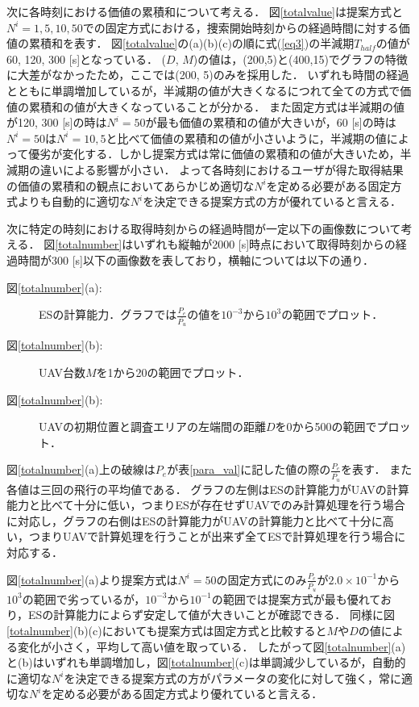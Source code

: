 \documentclass{ieeeaccess}
\begin{document}
次に各時刻における価値の累積和について考える．
図\ref{totalvalue}は提案方式と$N^i=1, 5, 10, 50$での固定方式における，捜索開始時刻からの経過時間に対する価値の累積和を表す．
図\ref{totalvalue}の(a)(b)(c)の順に式(\ref{eq3})の半減期$T_{half}$の値が60, 120,  300 [s]となっている．
($D$, $M$)の値は，(200,5)と(400,15)でグラフの特徴に大差がなかったため，ここでは(200, 5)のみを採用した．
いずれも時間の経過とともに単調増加しているが，半減期の値が大きくなるにつれて全ての方式で価値の累積和の値が大きくなっていることが分かる．
また固定方式は半減期の値が120, 300 [s]の時は$N^i=50$が最も価値の累積和の値が大きいが，60 [s]の時は$N^i=50$は$N^i=10, 5$と比べて価値の累積和の値が小さいように，半減期の値によって優劣が変化する．しかし提案方式は常に価値の累積和の値が大きいため，半減期の違いによる影響が小さい．
よって各時刻におけるユーザが得た取得結果の価値の累積和の観点においてあらかじめ適切な$N^i$を定める必要がある固定方式よりも自動的に適切な$N^i$を決定できる提案方式の方が優れていると言える．

次に特定の時刻における取得時刻からの経過時間が一定以下の画像数について考える．
図\ref{totalnumber}はいずれも縦軸が2000 [s]時点において取得時刻からの経過時間が300 [s]以下の画像数を表しており，横軸については以下の通り．
\begin{description}
\item[図\ref{totalnumber}(a):]ESの計算能力．グラフでは$\frac{P_e}{\overline{P_u}}$の値を$10^{-3}$から$10^3$の範囲でプロット．
\item[図\ref{totalnumber}(b):]UAV台数$M$を1から20の範囲でプロット．
\item[図\ref{totalnumber}(b):]UAVの初期位置と調査エリアの左端間の距離$D$を0から500の範囲でプロット．
\end{description}

図\ref{totalnumber}(a)上の破線は$P_e$が表\ref{para_val}に記した値の際の$\frac{P_e}{\overline{P_u}}$を表す．
また各値は三回の飛行の平均値である．
グラフの左側はESの計算能力がUAVの計算能力と比べて十分に低い，つまりESが存在せずUAVでのみ計算処理を行う場合に対応し，グラフの右側はESの計算能力がUAVの計算能力と比べて十分に高い，つまりUAVで計算処理を行うことが出来ず全てESで計算処理を行う場合に対応する．

図\ref{totalnumber}(a)より提案方式は$N^i=50$の固定方式にのみ$\frac{P_e}{\overline{P_u}}$が$2.0\times10^{-1}$から$10^3$の範囲で劣っているが，$10^{-3}$から$10^{-1}$の範囲では提案方式が最も優れており，ESの計算能力によらず安定して値が大きいことが確認できる．
同様に図\ref{totalnumber}(b)(c)においても提案方式は固定方式と比較すると$M$や$D$の値による変化が小さく，平均して高い値を取っている．
したがって図\ref{totalnumber}(a)と(b)はいずれも単調増加し，図\ref{totalnumber}(c)は単調減少しているが，自動的に適切な$N^i$を決定できる提案方式の方がパラメータの変化に対して強く，常に適切な$N^i$を定める必要がある固定方式より優れていると言える．
\end{document}
